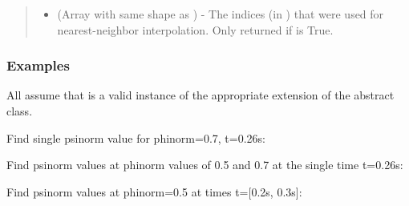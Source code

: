 \documentclass[letterpaper,10pt,english]{sphinxmanual}
\begin{document}
\begin{fulllineitems}
\begin{fulllineitems}
\begin{quote}
\begin{description}
\begin{itemize}
\item {} 
 (Array with same shape as ) - The indices
(in ) that were used for
nearest-neighbor interpolation. Only returned if  is
True.

\end{itemize}


\end{description}\end{quote}
\subsubsection*{Examples}

All assume that  is a valid instance of the appropriate
extension of the {\hyperref[\detokenize{eqtools:eqtools.core.Equilibrium}]{}} abstract class.

Find single psinorm value for phinorm=0.7, t=0.26s:

\begin{sphinxVerbatim}[commandchars=\\\{\}]
   
\end{sphinxVerbatim}

Find psinorm values at phinorm values of 0.5 and 0.7 at the single time
t=0.26s:

\begin{sphinxVerbatim}[commandchars=\\\{\}]
  \PYG{p}{[} \PYG{p}{]} 
\end{sphinxVerbatim}

Find psinorm values at phinorm=0.5 at times t={[}0.2s, 0.3s{]}:

\begin{sphinxVerbatim}[commandchars=\\\{\}]
   \PYG{p}{[} \PYG{p}{]}
\end{sphinxVerbatim}


\end{fulllineitems}
\end{fulllineitems}
\end{document}
